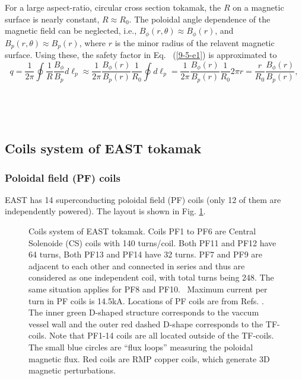 \documentclass{llncs}
\begin{document}
For a large aspect-ratio, circular cross section tokamak, the $R$ on a
magnetic surface is nearly constant, $R \approx R_0$. The poloidal angle
dependence of the magnetic field can be neglected, i.e., $B_{\phi} (r, \theta)
\approx B_{\phi} (r)$, and $B_p (r, \theta) \approx B_p (r)$, where $r$ is the
minor radius of the relavent magnetic surface. Using these, the safety factor
in Eq. \ (\ref{9-5-e1}) is approximated to
\begin{equation}
  q = \frac{1}{2 \pi} \oint \frac{1}{R} \frac{B_{\phi}}{B_p} d \ell_p \approx
  \frac{1}{2 \pi} \frac{B_{\phi} (r)}{B_p (r)}  \frac{1}{R_0} \oint d \ell_p =
  \frac{1}{2 \pi} \frac{B_{\phi} (r)}{B_p (r)}  \frac{1}{R_0} 2 \pi r =
  \frac{r}{R_0}  \frac{B_{\phi} (r)}{B_p (r)},
\end{equation}


\

\

\subsection{Coils system of EAST tokamak}

\subsubsection{Poloidal field (PF) coils}

EAST has 14 superconducting poloidal field (PF) coils (only 12 of them are
independently powered). The layout is shown in Fig. \ref{19-5-4-p1}.

\begin{figure}[h]
  \caption{\label{19-5-4-p1}Coils system of EAST tokamak. Coils PF1 to PF6 are
  Central Solenoide (CS) coils with 140 turns/coil. Both PF11 and PF12 have 64
  turns, Both PF13 and PF14 have 32 turns. PF7 and PF9 are adjacent to each
  other and connected in series and thus are considered as one independent
  coil, with total turns being 248. The same situation applies for PF8 and
  PF10. \ Maximum current per turn in PF coils is 14.5kA. Locations of PF
  coils are from Refs. {\cite{ysun2012}}{\cite{yychen2019}}. The inner green
  D-shaped structure corresponds to the vaccum vessel wall and the outer red
  dashed D-shape corresponds to the TF-coils. Note that PF1-14 coils are all
  located outside of the TF-coils. The small blue circles are ``flux loops''
  measuring the poloidal magnetic flux. Red coils are RMP copper coils, which
  generate 3D magnetic perturbations.}
\end{figure}
\end{document}
